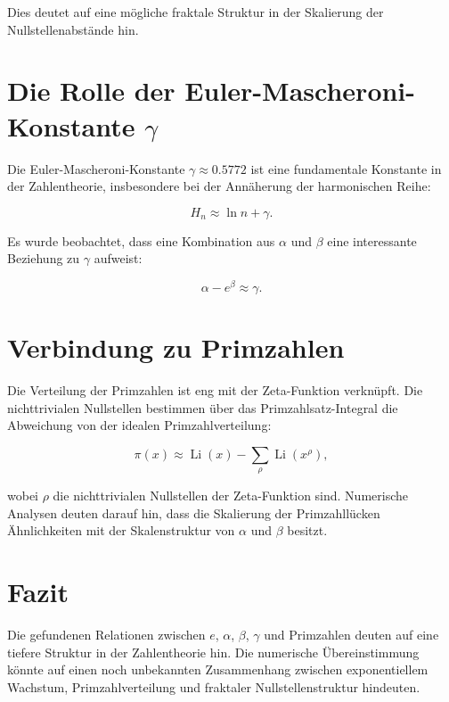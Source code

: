 \documentclass[a4paper,12pt]{article}
\begin{document}
Dies deutet auf eine mögliche fraktale Struktur in der Skalierung der Nullstellenabstände hin.

\section{Die Rolle der Euler-Mascheroni-Konstante \( \gamma \)}
Die Euler-Mascheroni-Konstante \( \gamma \approx 0.5772 \) ist eine fundamentale Konstante in der Zahlentheorie, insbesondere bei der Annäherung der harmonischen Reihe:

\begin{equation}
H_n \approx \ln n + \gamma.
\end{equation}

Es wurde beobachtet, dass eine Kombination aus \( \alpha \) und \( \beta \) eine interessante Beziehung zu \( \gamma \) aufweist:

\begin{equation}
\alpha - e^{\beta} \approx \gamma.
\end{equation}

\section{Verbindung zu Primzahlen}
Die Verteilung der Primzahlen ist eng mit der Zeta-Funktion verknüpft. Die nichttrivialen Nullstellen bestimmen über das Primzahlsatz-Integral die Abweichung von der idealen Primzahlverteilung:

\begin{equation}
\pi(x) \approx \operatorname{Li}(x) - \sum_{\rho} \operatorname{Li}(x^\rho),
\end{equation}

wobei \( \rho \) die nichttrivialen Nullstellen der Zeta-Funktion sind. Numerische Analysen deuten darauf hin, dass die Skalierung der Primzahllücken Ähnlichkeiten mit der Skalenstruktur von \( \alpha \) und \( \beta \) besitzt.

\section{Fazit}
Die gefundenen Relationen zwischen \( e \), \( \alpha \), \( \beta \), \( \gamma \) und Primzahlen deuten auf eine tiefere Struktur in der Zahlentheorie hin. Die numerische Übereinstimmung könnte auf einen noch unbekannten Zusammenhang zwischen exponentiellem Wachstum, Primzahlverteilung und fraktaler Nullstellenstruktur hindeuten.
\end{document}
